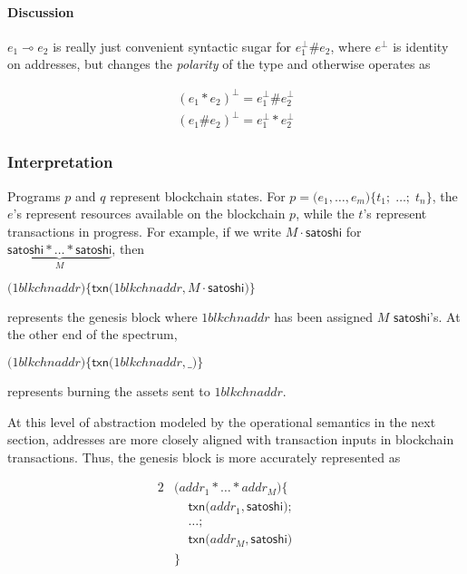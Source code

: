 \documentclass[]{acm_proc_article-sp}
\numberwithin{equation}{subsection}
\begin{document}
\paragraph{Discussion}
$e_1 \multimap e_2$ is really just convenient syntactic sugar for
$e_1^{\perp} \# e_2$, where $e^{\perp}$ is identity on addresses, but
changes the \emph{polarity} of the type and otherwise operates as

\begin{equation*}
  \begin{aligned}
    ( e_1 * e_2 )^{\perp} = e_1^{\perp} \# e_2^{\perp} \\
    ( e_1 \# e_2 )^{\perp} = e_1^{\perp} * e_2^{\perp}
  \end{aligned}
\end{equation*}

\subsubsection{Interpretation}
Programs $p$ and $q$ represent blockchain states. For $p = \mathsf{(}
e_1, \ldots, e_m \mathsf{)} \mathsf{\{} t_1 \mathsf{;} \; \ldots
\mathsf{;} \; t_n \mathsf{\}}$, the $e$'s represent resources
available on the blockchain $p$, while the $t$'s represent
transactions in progress. For example, if we write $M \cdot \mathsf{satoshi}$ for $\underbrace{\mathsf{satoshi} * \ldots * \mathsf{satoshi}}_{M}$, then 

$\mathsf{(} 1blkchnaddr {)} \mathsf{\{} \mathsf{txn}\mathsf{(} 1blkchnaddr, M \cdot \mathsf{satoshi} \mathsf{)} \mathsf{\}}$

represents the genesis block where $1blkchnaddr$ has been assigned $M$
$\mathsf{satoshi}$'s. At the other end of the spectrum,

$\mathsf{(} 1blkchnaddr {)} \mathsf{\{} \mathsf{txn}\mathsf{(} 1blkchnaddr, \mathsf{\_} \mathsf{)} \mathsf{\}}$

represents burning the assets sent to $1blkchnaddr$.

At this level of abstraction modeled by the operational semantics in
the next section, addresses are more closely aligned with transaction
inputs in blockchain transactions. Thus, the genesis block is more
accurately represented as 

\begin{alignat*}{2}
  &\mathsf{(} addr_1 * \ldots * addr_M {)} \mathsf{\{} && \\
  &\;\;\;\;\mathsf{txn}\mathsf{(} addr_1, \mathsf{satoshi} \mathsf{)} \mathsf{;} && \\
  &\;\;\;\;\ldots \mathsf{;} && \\
  &\;\;\;\;\mathsf{txn}\mathsf{(}addr_M, \mathsf{satoshi} \mathsf{)} && \\
  &\mathsf{\}} &&
\end{alignat*} 
\end{document}

